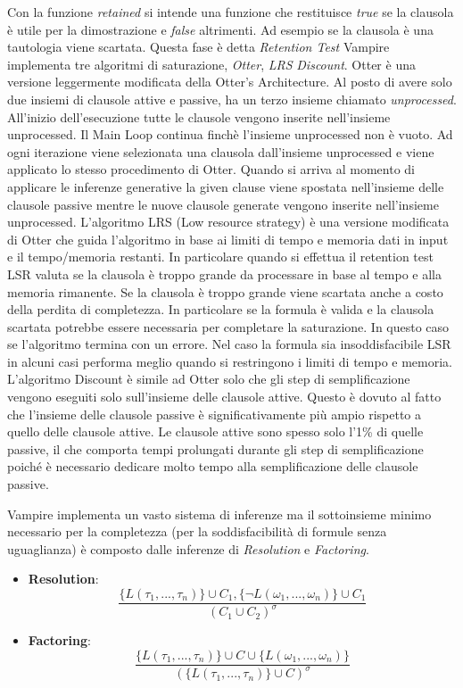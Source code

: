 \documentclass[./main.tex]{subfiles}
\begin{document}
Con la funzione \textit{retained} si intende una funzione che restituisce \textit{true} se la clausola 
è utile per la dimostrazione e \textit{false} altrimenti. 
Ad esempio se la clausola è una tautologia viene scartata.
Questa fase è detta \textit{Retention Test}
Vampire implementa tre algoritmi di saturazione, \textit{Otter}, \textit{LRS} \textit{Discount}.
Otter è una versione leggermente modificata della Otter's Architecture. Al posto di avere solo due insiemi di clausole attive e passive,
ha un terzo insieme chiamato \textit{unprocessed}. 
All'inizio dell'esecuzione tutte le clausole vengono inserite nell'insieme unprocessed.
Il Main Loop continua finchè l'insieme unprocessed non è vuoto.
Ad ogni iterazione viene selezionata una clausola dall'insieme unprocessed e viene applicato lo stesso procedimento di Otter.
Quando si arriva al momento di applicare le inferenze generative la given clause viene spostata nell'insieme delle clausole passive 
mentre le nuove clausole generate vengono inserite nell'insieme unprocessed.
L'algoritmo LRS (Low resource strategy) è una versione modificata di Otter che guida l'algoritmo in base ai limiti di tempo e memoria dati in input 
e il tempo/memoria restanti. 
In particolare quando si effettua il retention test LSR valuta se la clausola è troppo grande da processare in base al tempo e alla memoria rimanente.
Se la clausola è troppo grande viene scartata anche a costo della perdita di completezza.
In particolare se la formula è valida e la clausola scartata potrebbe essere necessaria per completare la saturazione.
In questo caso se l'algoritmo termina con un errore.
Nel caso la formula sia insoddisfacibile LSR in alcuni casi performa meglio quando si restringono i limiti di tempo e memoria.
L'algoritmo Discount è simile ad Otter solo che gli step di semplificazione vengono eseguiti solo sull'insieme delle clausole attive.
Questo è dovuto al fatto che l'insieme delle clausole passive è significativamente più ampio rispetto a quello delle clausole attive. 
Le clausole attive sono spesso solo l'1\% di quelle passive, il che comporta tempi prolungati durante gli step di semplificazione 
poiché è necessario dedicare molto tempo alla semplificazione delle clausole passive.

Vampire implementa un vasto sistema di inferenze ma il sottoinsieme minimo necessario per la completezza (per la soddisfacibilità di formule senza uguaglianza) è composto 
dalle inferenze di \textit{Resolution} e \textit{Factoring}.

\begin{itemize}
    \item[]\textbf{Resolution}: 
    $$ \frac{\{L(\tau_1, ..., \tau_n)\} \cup C_1, \{\lnot L(\omega_1, ..., \omega_n)\} \cup C_1}{(C_1 \cup C_2)^\sigma} $$
    \item[]\textbf{Factoring}: 
    $$ \frac{\{L(\tau_1, ..., \tau_n)\} \cup C \cup \{L(\omega_1, ..., \omega_n)\}}{(\{L(\tau_1, ..., \tau_n)\} \cup C)^\sigma} $$
\end{itemize}
\end{document}
